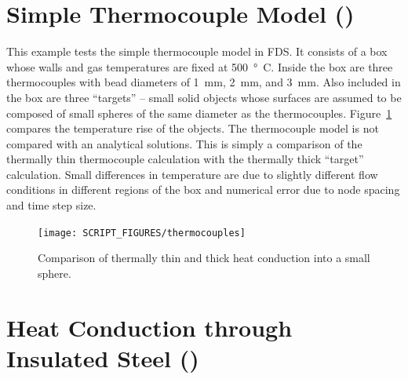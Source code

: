 \documentclass[11pt]{book}
\begin{document}
\section{Simple Thermocouple Model (\texorpdfstring{}{thermocouples})}
\label{thermocouples}

This example tests the simple thermocouple model in FDS. It consists of a box whose walls and gas temperatures are fixed at 500~\si{\degree C}. Inside the box are three thermocouples with bead diameters of 1~mm, 2~mm, and 3~mm. Also included in the box are three ``targets'' -- small solid objects whose surfaces are assumed to be composed of small spheres of the same diameter as the thermocouples. Figure~\ref{thermocouples_fig} compares the temperature rise of the objects. The thermocouple model is not compared with an analytical solutions. This is simply a comparison of the thermally thin thermocouple calculation with the thermally thick ``target'' calculation. Small differences in temperature are due to slightly different flow conditions in different regions of the box and numerical error due to node spacing and time step size.

\begin{figure}[ht]
\centering
\texttt{[image: SCRIPT\_FIGURES/thermocouples]}
\caption[The  test case]{Comparison of thermally thin and thick heat conduction into a small sphere.}
\label{thermocouples_fig}
\end{figure}



\section{Heat Conduction through Insulated Steel (\texorpdfstring{}{insulated\_steel\_x})}
\label{insulated_steel_pipe}
\label{insulated_steel_plate}
\end{document}
